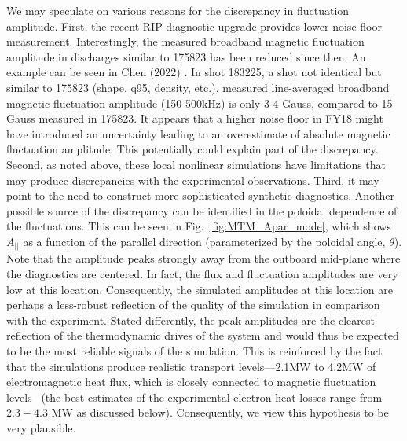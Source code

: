 \documentclass[
 aip,
 amsmath,amssymb,
 reprint
]{revtex4-1}
\begin{document}
We may speculate on various reasons for the discrepancy in fluctuation amplitude.  First, the recent RIP diagnostic upgrade  \cite{doi:10.1063/5.0040306} provides lower noise floor measurement. Interestingly, the measured broadband magnetic fluctuation amplitude in discharges similar to 175823 has been reduced since then. An example can be seen in Chen (2022) \cite{Chen_RIP_U_2022}.   In shot 183225, a shot not identical but similar to 175823 (shape, q95, density, etc.), measured line-averaged broadband magnetic fluctuation amplitude (150-500kHz) is only 3-4 Gauss, compared to 15 Gauss measured in 175823. It appears that a higher noise floor in FY18 might have introduced an uncertainty leading to an overestimate of absolute magnetic fluctuation amplitude. This potentially could explain part of the discrepancy. 
Second, as noted above, these local nonlinear simulations have limitations that may produce discrepancies with the experimental observations.  
Third, it may point to the need to construct more sophisticated synthetic diagnostics.
Another possible source of the discrepancy can be identified in the poloidal dependence of the fluctuations.  This can be seen in Fig.~\ref{fig:MTM_Apar_mode}, which shows $A_{||}$ as a function of the parallel direction (parameterized by the poloidal angle, $\theta$).  Note that the amplitude peaks strongly away from the outboard mid-plane where the diagnostics are centered.  In fact, the flux and fluctuation amplitudes are very low at this location.  Consequently, the simulated amplitudes at this location are perhaps a less-robust reflection of the quality of the simulation in comparison with the experiment.  Stated differently, the peak amplitudes are the clearest reflection of the thermodynamic drives of the system and would thus be expected to be the most reliable signals of the simulation.  This is reinforced by the fact that the simulations produce realistic transport levels---2.1MW to 4.2MW of electromagnetic heat flux, which is closely connected to magnetic fluctuation levels~\cite{Pueschel_2008} (the best estimates of the experimental electron heat losses range from $2.3-4.3$ MW as discussed below).  Consequently, we view this hypothesis to be very plausible.  
\end{document}
